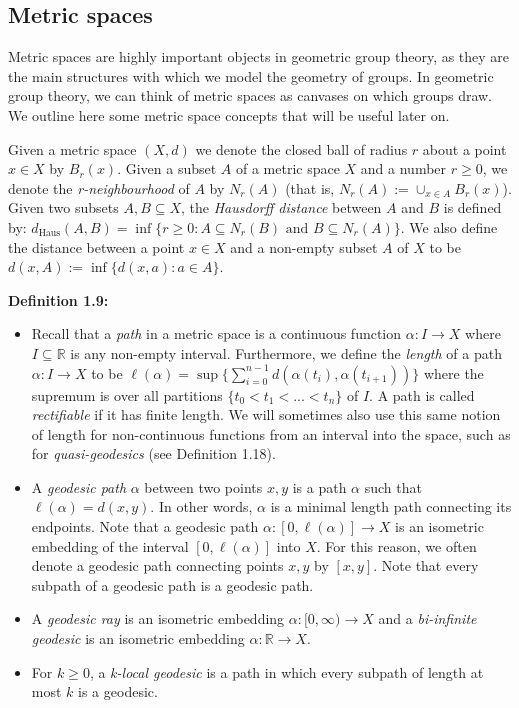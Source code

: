 \documentclass[12pt]{article}
\newcommand{\vs}{\vskip10pt}
\begin{document}
	
	\newpage
	
	\subsection{Metric spaces}
	
	Metric spaces are highly important objects in geometric group theory, as they are the main structures with which we model the geometry of groups. In geometric group theory, we can think of metric spaces as canvases on which groups draw. We outline here some metric space concepts that will be useful later on.
	
	\vs 
	
	Given a metric space $(X,d)$ we denote the closed ball of radius $r$ about a point $x \in X$ by $B_r(x)$. Given a subset $A$ of a metric space $X$ and a number $r \geq 0$, we denote the \textit{r-neighbourhood} of $A$ by $N_r(A)$ (that is, $N_r(A) := \cup_{x \in A} B_r(x)$). Given two subsets $A,B \subseteq X$, the \textit{Hausdorff distance} between $A$ and $B$ is defined by: $d_{\text{Haus}}(A,B) = \inf\{r \geq 0: A \subseteq N_r(B) \text{ and } B \subseteq N_r(A)\}$. We also define the distance between a point $x \in X$ and a non-empty subset $A$ of $X$ to be $d(x, A) := \inf \{d(x, a): a \in A\}$. 
	
	\vs 
	
	\textbf{Definition 1.9: } 
	
	\begin{itemize}
		\item Recall that a \textit{path} in a metric space is a continuous function $\alpha: I \rightarrow X$ where $I \subseteq \mathbb{R}$ is any non-empty interval. Furthermore, we define the \textit{length} of a path $\alpha: I \rightarrow X$ to be $\ell(\alpha) = \sup \{\sum_{i=0}^{n-1} d(\alpha(t_i), \alpha(t_{i+1}))\}$ where the supremum is over all partitions $\{t_0 < t_1 < ... < t_n\}$ of $I$. A path is called \textit{rectifiable} if it has finite length. We will sometimes also use this same notion of length for non-continuous functions from an interval into the space, such as for \textit{quasi-geodesics} (see Definition 1.18). 
		\item A \textit{geodesic path} $\alpha$ between two points $x,y$ is a path $\alpha$ such that $\ell(\alpha) = d(x,y)$. In other words, $\alpha$ is a minimal length path connecting its endpoints. Note that a geodesic path $\alpha: [0, \ell(\alpha)] \rightarrow X$ is an isometric embedding of the interval $[0, \ell(\alpha)]$ into $X$. For this reason, we often denote a geodesic path connecting points $x,y$ by $[x,y]$. Note that every subpath of a geodesic path is a geodesic path. 
		\item A \textit{geodesic ray} is an isometric embedding $\alpha: [0, \infty) \rightarrow X$ and a \textit{bi-infinite geodesic} is an isometric embedding $\alpha: \mathbb{R} \rightarrow X$. 
		\item For $k \geq 0$, a \textit{k-local geodesic} is a path in which every subpath of length at most $k$ is a geodesic. 
	\end{itemize}
	
\end{document}
